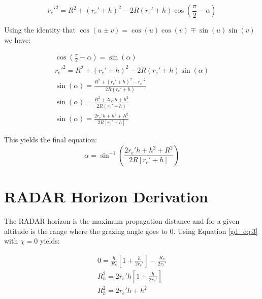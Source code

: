 \begin{equation}
r_e'^2 = R^2 + \left(r_e' + h \right)^2 - 2R\left(r_e' + h \right)\cos\left(\frac{\pi}{2} - \alpha \right)
\label{gd_eq:4}
\end{equation}
\renewcommand{\baselinestretch}{2} \small\normalsize

\noindent Using the identity that $\cos(u \pm v) = \cos(u)\cos(v) \mp \sin(u)\sin(v)$ we have:

\begin{equation}
\begin{gathered}
\cos\left(\frac{\pi}{2} - \alpha \right) = \sin\left(\alpha\right) \\
r_e'^2 = R^2 + \left(r_e' + h \right)^2 - 2R\left(r_e' + h \right) \sin\left(\alpha\right)\\
\sin\left(\alpha\right) = \frac{R^2 + \left(r_e' + h \right)^2 - r_e'^2}{2R\left(r_e' + h \right)} \\
\sin\left(\alpha\right) = \frac{R^2 + 2r_e'h + h^2}{2R\left(r_e' + h \right)}\\
\sin\left(\alpha\right) =  \frac{2r_e'h + h^2 + R^2}{2R\left[r_e' + h \right]}
\end{gathered}
\label{gd_eq:5}
\end{equation}
\renewcommand{\baselinestretch}{2} \small\normalsize

\noindent This yields the final equation:
\begin{equation}
\label{gd_eq:6}
\boxed{\alpha = \sin^{-1}\left(\frac{2r_e'h + h^2 + R^2}{2R\left[r_e' + h \right]} \right)}
\end{equation}
\renewcommand{\baselinestretch}{2} \small\normalsize

\section{RADAR Horizon Derivation}
The RADAR horizon is the maximum propagation distance and for a given altitude is the range where the grazing angle goes to $0$. Using Equation \ref{gd_eq:3} with $\chi = 0$ yields:

\begin{equation}
\begin{gathered}
\label{gd_eq:7}
0 = \frac{h}{R_h}\left[1 + \frac{h}{2r_e'} \right] - \frac{R_h}{2r_e'} \\
R_h^2 = 2r_e'h\left[1 + \frac{h}{2r_e'} \right] \\
R_h^2 = 2r_e'h + h^2
\end{gathered}
\end{equation}

